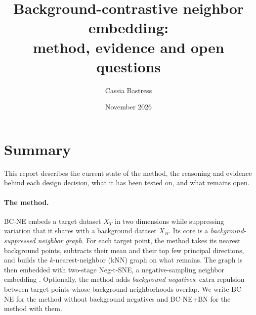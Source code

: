 \documentclass[10pt]{article}
\title{Background-contrastive neighbor embedding:\\ method, evidence and open questions}
\author{Cassia Bastress}
\date{November 2026}
\newcommand{\methodname}{BC-NE}
\newcommand{\BN}{\methodname{}+BN}
\begin{document}
\maketitle

\section{Summary}
\label{sec:summary}

This report describes the current state of the method, the reasoning and evidence behind each design decision, what it has been tested on, and what remains open.

\paragraph{The method.} \methodname{} embeds a target dataset $X_T$ in two dimensions while suppressing variation that it shares with a background dataset $X_B$. Its core is a \emph{background-suppressed neighbor graph}. For each target point, the method takes its nearest background points, subtracts their mean and their top few principal directions, and builds the $k$-nearest-neighbor (kNN) graph on what remains. The graph is then embedded with two-stage Neg-t-SNE, a negative-sampling neighbor embedding \cite{damrich2023tsne}. Optionally, the method adds \emph{background negatives}: extra repulsion between target points whose background neighborhoods overlap. We write \methodname{} for the method without background negatives and \BN{} for the method with them.
\end{document}
